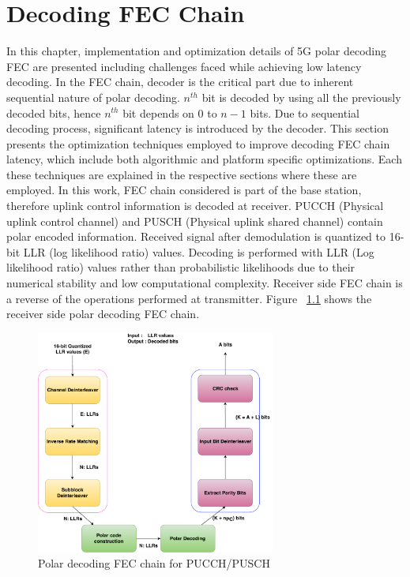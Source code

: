 \chapter{Decoding FEC Chain} \label{chap:DecodingChain}
In this chapter, implementation and optimization details of 5G polar decoding FEC are presented including challenges faced while achieving low latency decoding. In the FEC chain, decoder is the critical part due to inherent sequential nature of polar decoding. $n^{th}$ bit is decoded by using all the previously decoded bits, hence $n^{th}$ bit depends on $0$ to $n-1$ bits. Due to sequential decoding process, significant latency is introduced by the decoder. This section presents the optimization techniques employed to improve decoding FEC chain latency, which include both algorithmic and platform specific optimizations. Each these techniques are explained in the respective sections where these are employed. In this work, FEC chain considered is part of the base station, therefore uplink control information is decoded at receiver. PUCCH (Physical uplink control channel) and PUSCH (Physical uplink shared channel) contain polar encoded information. Received signal after demodulation is quantized to 16-bit LLR (log likelihood ratio) values. Decoding is performed with LLR (Log likelihood ratio) values rather than probabilistic likelihoods due to their numerical stability and low computational complexity. Receiver side FEC chain is a reverse of the operations performed at transmitter. Figure ~\ref{fig:5grx_fec_chain} shows the receiver side polar decoding FEC chain.

\begin{figure}[]
	\centering
	\includegraphics[width=0.7\textwidth]{./figures/receiverFECChain_crc.pdf}
	\caption{Polar decoding FEC chain for PUCCH/PUSCH}
	\label{fig:5grx_fec_chain}
\end{figure}

